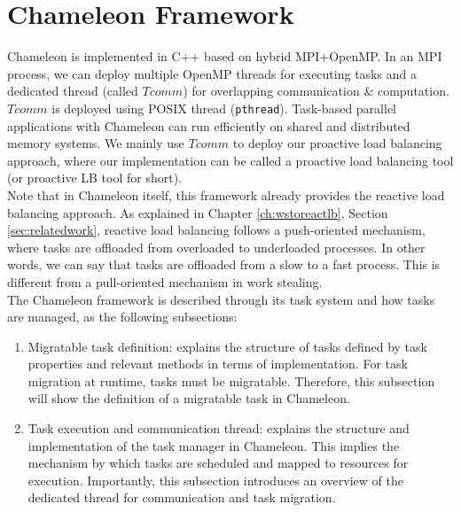 \section{Chameleon Framework}
\label{sec:PoC-Chameleon}

Chameleon is implemented in C++ based on hybrid MPI+OpenMP. In an MPI process, we can deploy multiple OpenMP threads for executing tasks and a dedicated thread (called $Tcomm$) for overlapping communication \& computation. $Tcomm$ is deployed using POSIX thread (\texttt{pthread}). Task-based parallel applications with Chameleon can run efficiently on shared and distributed memory systems. We mainly use $Tcomm$ to deploy our proactive load balancing approach, where our implementation can be called a proactive load balancing tool (or proactive LB tool for short).\\


Note that in Chameleon itself, this framework already provides the reactive load balancing approach. As explained in Chapter \ref{ch:wstoreactlb}, Section \ref{sec:relatedwork}, reactive load balancing follows a push-oriented mechanism, where tasks are offloaded from overloaded to underloaded processes. In other words, we can say that tasks are offloaded from a slow to a fast process. This is different from a pull-oriented mechanism in work stealing.\\

The Chameleon framework is described through its task system and how tasks are managed, as the following subsections:
\begin{enumerate}
	\item Migratable task definition: explains the structure of tasks defined by task properties and relevant methods in terms of implementation. For task migration at runtime, tasks must be migratable. Therefore, this subsection will show the definition of a migratable task in Chameleon.
	\item Task execution and communication thread: explains the structure and implementation of the task manager in Chameleon. This implies the mechanism by which tasks are scheduled and mapped to resources for execution. Importantly, this subsection introduces an overview of the dedicated thread for communication and task migration. 
\end{enumerate}

